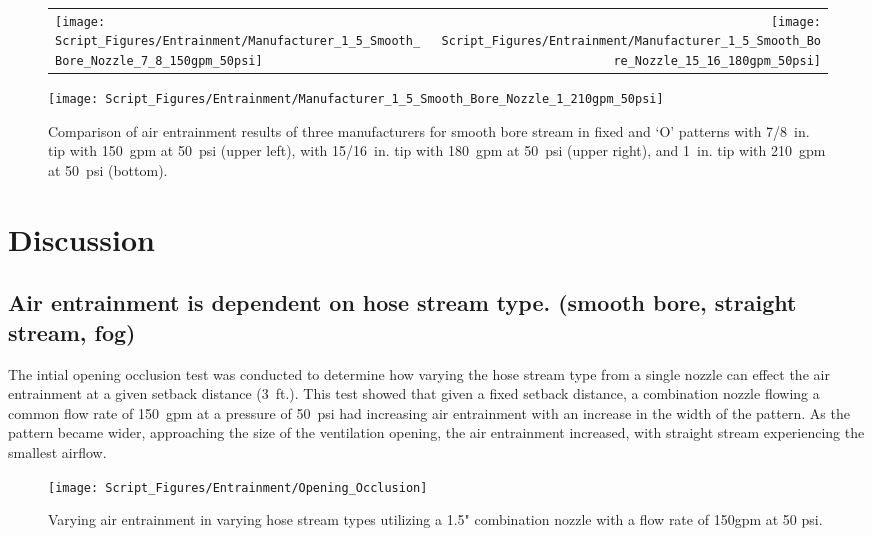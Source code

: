 \documentclass[12pt,oneside]{book}
\begin{document}
\begin{figure}[!ht]
\begin{tabular*}{\textwidth}{lr}
\texttt{[image: Script\_Figures/Entrainment/Manufacturer\_1\_5\_Smooth\_Bore\_Nozzle\_7\_8\_150gpm\_50psi]} &
\texttt{[image: Script\_Figures/Entrainment/Manufacturer\_1\_5\_Smooth\_Bore\_Nozzle\_15\_16\_180gpm\_50psi]} \\
\end{tabular*}
\centering
\texttt{[image: Script\_Figures/Entrainment/Manufacturer\_1\_5\_Smooth\_Bore\_Nozzle\_1\_210gpm\_50psi]} 
\caption[Average Air Entrainment Varying Manufacturer with Smooth Bore Nozzles]{Comparison of air entrainment results of three manufacturers for smooth bore stream in fixed and `O' patterns with 7/8~in. tip with 150~gpm at 50~psi (upper left), with 15/16~in. tip with 180~gpm at 50~psi (upper right), and 1~in. tip with 210~gpm at 50~psi (bottom).}
\label{fig:1_5_Interior_Smooth_Bore_Manufacturer}
\end{figure}



\clearpage

\chapter{Discussion}

\section{Air entrainment is dependent on hose stream type. (smooth bore, straight stream, fog)} 

The intial opening occlusion test was conducted to determine how varying the hose stream type from a single nozzle can effect the air entrainment at a given setback distance (3~ft.). This test showed that given a fixed setback distance, a combination nozzle flowing a common flow rate of 150~gpm at a pressure of 50~psi had increasing air entrainment with an increase in the width of the pattern. As the pattern became wider, approaching the size of the ventilation opening, the air entrainment increased, with straight stream experiencing the smallest airflow. 

\begin{figure}[!ht]
	\centering
	\texttt{[image: Script\_Figures/Entrainment/Opening\_Occlusion]}
	\caption{Varying air entrainment in varying hose stream types utilizing a 1.5" combination nozzle with a flow rate of 150gpm at 50 psi.}
	\label{fig:Opening_Occlusion}
\end{figure}
\end{document}
